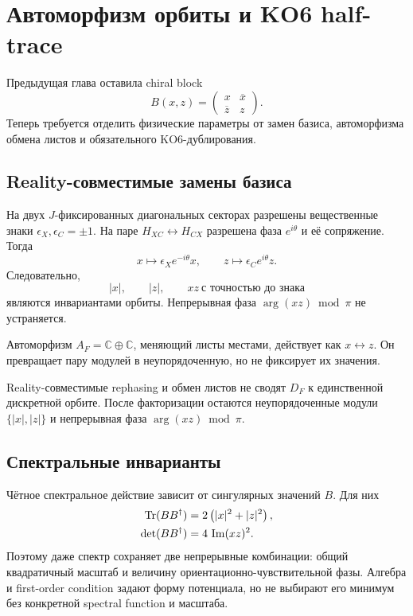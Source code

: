 \chapter{Автоморфизм орбиты и KO6 half-trace}

Предыдущая глава оставила chiral block
\begin{equation}
 B(x,z)=
 \begin{pmatrix}
 x&\overline x\\
 \overline z&z
 \end{pmatrix}.
\end{equation}
Теперь требуется отделить физические параметры от замен базиса,
автоморфизма обмена листов и обязательного KO6-дублирования.

\section{Reality-совместимые замены базиса}

На двух \(J\)-фиксированных диагональных секторах разрешены вещественные
знаки \(\epsilon_X,\epsilon_C=\pm1\). На паре
\(H_{XC}\leftrightarrow H_{CX}\) разрешена фаза
\(e^{i\theta}\) и её сопряжение. Тогда
\begin{equation}
 x\longmapsto
 \epsilon_Xe^{-i\theta}x,
 \qquad
 z\longmapsto
 \epsilon_Ce^{i\theta}z.
\end{equation}
Следовательно,
\begin{equation}
 |x|,\qquad |z|,\qquad xz\ \text{с точностью до знака}
\end{equation}
являются инвариантами орбиты. Непрерывная фаза
\(\arg(xz)\bmod\pi\) не устраняется.

Автоморфизм \(A_F=\mathbb C\oplus\mathbb C\), меняющий листы местами,
действует как \(x\leftrightarrow z\). Он превращает пару модулей в
неупорядоченную, но не фиксирует их значения.

\begin{proposition}
Reality-совместимые rephasing и обмен листов не сводят \(D_F\) к
единственной дискретной орбите. После факторизации остаются неупорядоченные
модули \(\{|x|,|z|\}\) и непрерывная фаза
\(\arg(xz)\bmod\pi\).
\end{proposition}

\section{Спектральные инварианты}

Чётное спектральное действие зависит от сингулярных значений \(B\).
Для них
\begin{align}
 \operatorname{Tr}(BB^\dagger)
 &=2\left(|x|^2+|z|^2\right),\\
 \det(BB^\dagger)
 &=4\,\operatorname{Im}(xz)^2.
\end{align}
Поэтому даже спектр сохраняет две непрерывные комбинации: общий
квадратичный масштаб и величину ориентационно-чувствительной фазы.
Алгебра и first-order condition задают форму потенциала, но не выбирают
его минимум без конкретной spectral function и масштаба.

